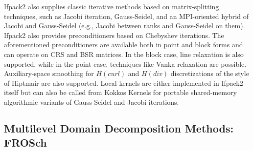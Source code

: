 Ifpack2 also supplies classic iterative methods based on matrix-splitting techniques, such as Jacobi iteration, Gauss-Seidel, and an MPI-oriented hybrid of Jacobi and Gauss-Seidel (e.g., Jacobi between ranks and Gauss-Seidel on them). Ifpack2 also provides preconditioners
based on Chebyshev iterations. The aforementioned preconditioners are available both in point and block
forms and can operate on CRS and BSR matrices. In the block case,
line relaxation is also supported, while in the point case, techniques
like Vanka relaxation \cite{Vanka1986} are possible.  Auxiliary-space
smoothing for $H(curl)$ and $H(div)$ discretizations of the style of
Hiptmair \cite{Hiptmair1997} are also supported.
Local kernels are either implemented in Ifpack2 itself
but can also be called from Kokkos Kernels for portable shared-memory algorithmic variants of Gauss-Seidel and Jacobi iterations.

\subsection{Multilevel Domain Decomposition Methods: FROSch}
\label{ssec:frosch}

